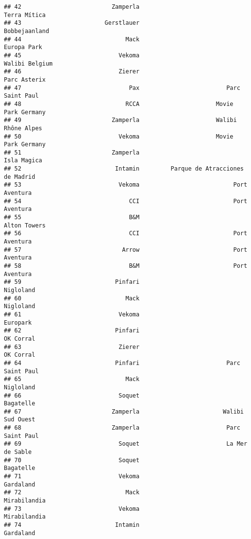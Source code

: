 \documentclass[
]{article}
\begin{document}
\begin{verbatim}
## 42                          Zamperla                            Terra Mítica
## 43                        Gerstlauer                           Bobbejaanland
## 44                              Mack                             Europa Park
## 45                            Vekoma                          Walibi Belgium
## 46                            Zierer                            Parc Asterix
## 47                               Pax                         Parc Saint Paul
## 48                              RCCA                      Movie Park Germany
## 49                          Zamperla                      Walibi Rhône Alpes
## 50                            Vekoma                      Movie Park Germany
## 51                          Zamperla                             Isla Magica
## 52                           Intamin         Parque de Atracciones de Madrid
## 53                            Vekoma                           Port Aventura
## 54                               CCI                           Port Aventura
## 55                               B&M                            Alton Towers
## 56                               CCI                           Port Aventura
## 57                             Arrow                           Port Aventura
## 58                               B&M                           Port Aventura
## 59                           Pinfari                               Nigloland
## 60                              Mack                               Nigloland
## 61                            Vekoma                                Europark
## 62                           Pinfari                               OK Corral
## 63                            Zierer                               OK Corral
## 64                           Pinfari                         Parc Saint Paul
## 65                              Mack                               Nigloland
## 66                            Soquet                               Bagatelle
## 67                          Zamperla                        Walibi Sud Ouest
## 68                          Zamperla                         Parc Saint Paul
## 69                            Soquet                         La Mer de Sable
## 70                            Soquet                               Bagatelle
## 71                            Vekoma                               Gardaland
## 72                              Mack                            Mirabilandia
## 73                            Vekoma                            Mirabilandia
## 74                           Intamin                               Gardaland

\end{verbatim}
\end{document}
